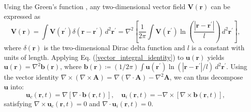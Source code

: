 \documentclass[aps,prl,twocolumn,showpacs,notitlepage,floatfix,superscriptaddress]{revtex4-1}
\begin{document}
Using the Green's function \cite{Watanabe2013}, any
two-dimensional vector field $\boldsymbol{V} \left( \boldsymbol{r}\right)$ can be expressed as
\begin{equation}\label{vector_integral_identity}
\boldsymbol{V} \left( \boldsymbol{r}\right)
=
\int
\boldsymbol{V} \left( \boldsymbol{r}^{\prime}\right)
\delta \left( \boldsymbol{r} - \boldsymbol{r}^{\prime} \right)
\, d^2 \boldsymbol{r}^{\prime}
=
\nabla^2
\left\lbrack
\frac{1}{2 \pi}
\int
\boldsymbol{V} \left( \boldsymbol{r}^{\prime}\right)
\ln \left( \frac{\left\vert \boldsymbol{r} - \boldsymbol{r}^{\prime} \right\vert}{l} \right)
\,
d^2 \boldsymbol{r}^{\prime}
\right\rbrack
,
\end{equation}
where $\delta \left( \boldsymbol{r} \right)$ is the two-dimensional Dirac delta function
and $l$ is a constant with units of length.
Applying Eq. (\ref{vector_integral_identity}) to $\boldsymbol{u}(\boldsymbol{r})$ yields $\boldsymbol{u}(\boldsymbol{r})=\nabla^{2}\boldsymbol{b}(\boldsymbol{r})$, where $
\boldsymbol{b} \left( \boldsymbol{r}\right)
\coloneqq
\left( 1 / 2 \pi \right)
\int
\boldsymbol{u} \left( \boldsymbol{r}^{\prime} \right)
\ln \left( \left\vert \boldsymbol{r} - \boldsymbol{r}^{\prime} \right\vert / l \right)
\, d^2 \boldsymbol{r}^{\prime}
$.
Using the vector identity $\nabla \times \left( \nabla \times \boldsymbol{A} \right) = \nabla \left( \nabla \cdot \boldsymbol{A} \right) - \nabla^2 \boldsymbol{A}$, we can thus decompose $\boldsymbol{u}$ into:
\begin{equation}
\boldsymbol{u}_{c} \left( \boldsymbol{r}, t \right)
=
\nabla
\left\lbrack
\nabla
\cdot
\boldsymbol{b} \left( \boldsymbol{r}, t \right)
\right\rbrack
, \quad
\boldsymbol{u}_{i} \left( \boldsymbol{r}, t \right)
=
-
\nabla
\times
\left\lbrack
\nabla
\times
\boldsymbol{b} \left( \boldsymbol{r}, t \right)
\right\rbrack,
\label{Eq:app:B:vc_vic_as_b}
\end{equation}
satisfying
$\nabla \times \boldsymbol{u}_{c} \left( \boldsymbol{r}, t \right) = 0$ and
$\nabla \cdot \boldsymbol{u}_{i} \left( \boldsymbol{r}, t \right) = 0$.
\end{document}
